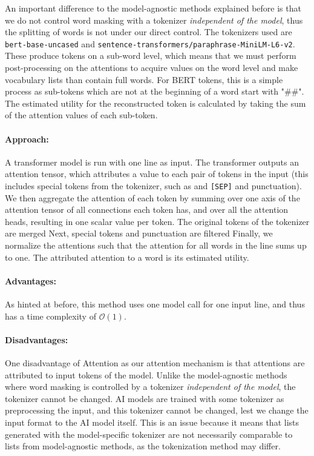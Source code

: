An important difference to the model-agnostic methods explained before is that we do not control word masking with a tokenizer \textit{independent of the model}, thus the splitting of words is not under our direct control.
The tokenizers used are \texttt{bert-base-uncased} and \texttt{sentence-transformers/paraphrase-MiniLM-L6-v2}.
These produce tokens on a sub-word level, which means that we must perform post-processing on the attentions to acquire values on the word level and make vocabulary lists than contain full words.
For BERT tokens, this is a simple process as sub-tokens which are not at the beginning of a word start with "\#\#".
The estimated utility for the reconstructed token is calculated by taking the sum of the attention values of each sub-token.

\paragraph{Approach:}
A transformer model is run with one line as input.
The transformer outputs an attention tensor, which attributes a value to each pair of tokens in the input (this includes special tokens from the tokenizer, such as and \texttt{[SEP]} and punctuation).
We then aggregate the attention of each token by summing over one axis of the attention tensor of all connections each token has, and over all the attention heads, resulting in one scalar value per token.
The original tokens of the tokenizer are merged
Next, special tokens and punctuation are filtered
Finally, we normalize the attentions such that the attention for all words in the line sums up to one.
The attributed attention to a word is its estimated utility.

\paragraph{Advantages:}
As hinted at before, this method uses one model call for one input line, and thus has a time complexity of $\mathcal{O}(1)$.

\paragraph{Disadvantages:}
One disadvantage of Attention as our attention mechanism is that attentions are attributed to input tokens of the model.
Unlike the model-agnostic methods where word masking is controlled by a tokenizer \textit{independent of the model}, the tokenizer cannot be changed.
AI models are trained with some tokenizer as preprocessing the input, and this tokenizer cannot be changed, lest we change the input format to the AI model itself.
This is an issue because it means that lists generated with the model-specific tokenizer are not necessarily comparable to lists from model-agnostic methods, as the tokenization method may differ.

